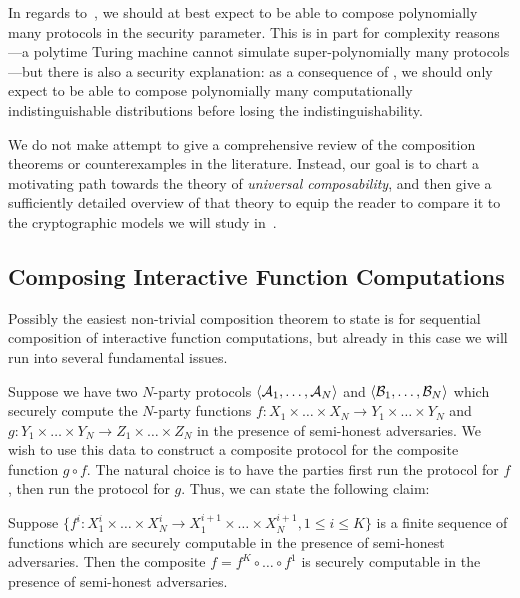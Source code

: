 In regards to~, we should at best expect
to be able to compose polynomially many protocols in the security parameter.
This is in part for complexity reasons---a polytime Turing machine cannot
simulate super-polynomially many protocols---but there is also a security
explanation: as a consequence of
, we should only
expect to be able to compose polynomially many computationally indistinguishable
distributions before losing the indistinguishability.

We do not make attempt to give a comprehensive review of the composition
theorems or counterexamples in the literature. Instead, our goal is to chart a
motivating path towards the theory of \emph{universal composability}, and then give a
sufficiently detailed overview of that theory to equip the reader to compare it
to the cryptographic models we will study
in~.

\subsection{Composing Interactive Function Computations}
\label{sec:function-composition}

Possibly the easiest non-trivial composition theorem to state is for sequential
composition of interactive function computations, but already in this case we
will run into several fundamental issues.

Suppose we have two $N$-party protocols $\langle\mathcal{A}_1,\dots,\mathcal{A}_N\rangle$ and
$\langle\mathcal{B}_1,\dots,\mathcal{B}_N\rangle$ which securely compute the $N$-party functions $f:
X_1\times\dots\times X_N\to Y_1\times\dots\times Y_N$ and $g:
Y_1\times\dots\times Y_N\to Z_1\times\dots\times Z_N$ in the presence of
semi-honest adversaries. We wish to use this data to construct a composite
protocol for the composite function $g\circ f$. The natural choice is to have
the parties first run the protocol for $f$, then run the protocol for $g$. Thus,
we can state the following claim:

\begin{claim}
  Suppose $\{f^i: X^i_1\times\dots\times X^i_N\to X^{i+1}_1\times\dots\times
  X^{i+1}_N, 1\leq i \leq K\}$ is a finite sequence of functions which are securely
  computable in the presence of semi-honest adversaries. Then the composite $f =
  f^K\circ\dots\circ f^1$ is securely computable in the presence of semi-honest
  adversaries.
\end{claim}

